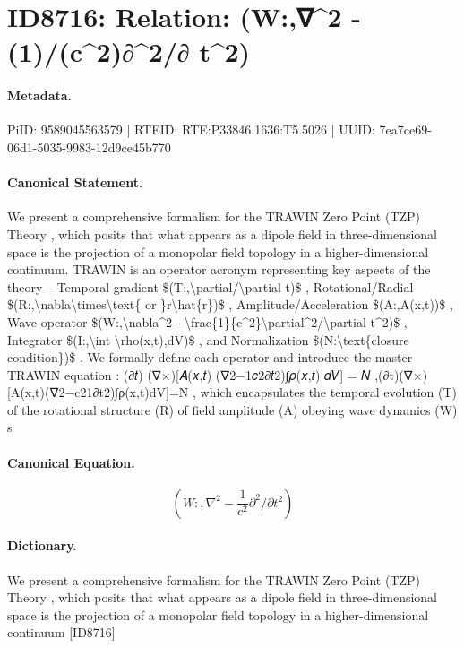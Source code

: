 \section*{ID8716: Relation: (W:,∇\textasciicircum{}2 - (1)/(c\textasciicircum{}2)∂\textasciicircum{}2/∂ t\textasciicircum{}2)}
\paragraph{Metadata.}
PiID: 9589045563579 | RTEID: RTE:P33846.1636:T5.5026 | UUID: 7ea7ce69-06d1-5035-9983-12d9ce45b770

\paragraph{Canonical Statement.}
We present a comprehensive formalism for the TRAWIN Zero Point (TZP) Theory , which posits that what appears as a dipole field in three-dimensional space is the projection of a monopolar field topology in a higher-dimensional continuum. TRAWIN is an operator acronym representing key aspects of the theory – Temporal gradient \$(T:,\textbackslash{}partial/\textbackslash{}partial t)\$ , Rotational/Radial \$(R:,\textbackslash{}nabla\textbackslash{}times\textbackslash{}text\{ or \}r\textbackslash{}hat\{r\})\$ , Amplitude/Acceleration \$(A:,A(x,t))\$ , Wave operator \$(W:,\textbackslash{}nabla\textasciicircum{}2 - \textbackslash{}frac\{1\}\{c\textasciicircum{}2\}\textbackslash{}partial\textasciicircum{}2/\textbackslash{}partial t\textasciicircum{}2)\$ , Integrator \$(I:,\textbackslash{}int \textbackslash{}rho(x,t),dV)\$ , and Normalization \$(N:\textbackslash{}text\{closure condition\})\$ . We formally define each operator and introduce the master TRAWIN equation : (∂𝑡) (∇×)[𝐴(𝑥,𝑡) (∇2−1𝑐2∂𝑡2)∫𝜌(𝑥,𝑡) 𝑑𝑉] = 𝑁 ,(∂t​)(∇×)[A(x,t)(∇2−c21​∂t2​)∫ρ(x,t)dV]=N , which encapsulates the temporal evolution (T) of the rotational structure (R) of field amplitude (A) obeying wave dynamics (W) s

\paragraph{Canonical Equation.}
\[
(W:,\nabla^2 - \frac{1}{c^2}\partial^2/\partial t^2)
\]

\paragraph{Dictionary.}
We present a comprehensive formalism for the TRAWIN Zero Point (TZP) Theory , which posits that what appears as a dipole field in three-dimensional space is the projection of a monopolar field topology in a higher-dimensional continuum [ID8716]

